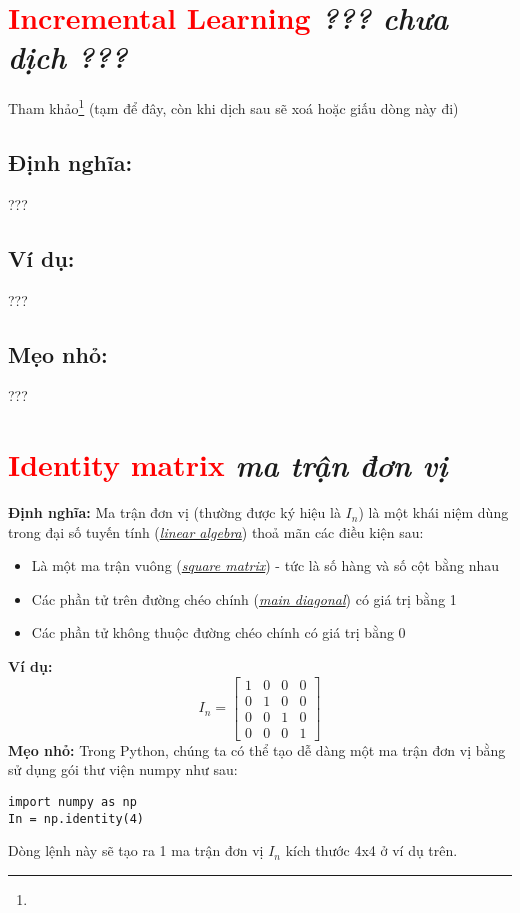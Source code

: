 \section*{\huge \textcolor{Red}{Incremental Learning}  \small \textit{??? chưa dịch ???} }
Tham khảo\footnote{} (tạm để đây, còn khi dịch sau sẽ xoá hoặc giấu dòng này đi)
\subsection*{Định nghĩa:}
???
\subsection*{Ví dụ:}
???
\subsection*{Mẹo nhỏ:}
???
\section*{\huge \textcolor{Red}{Identity matrix}  \small \textit{ma trận đơn vị} }
\large {\textbf{Định nghĩa:}}
\newline
\noindent
\newline
Ma trận đơn vị (thường được ký hiệu là \(I_n\)) là một khái niệm dùng trong đại số tuyến tính   (\underline{\textit{linear algebra}}) thoả mãn các điều kiện sau:
\begin{itemize}
\item Là một ma trận vuông (\underline{\textit{square matrix}}) - tức là số hàng và số cột bằng nhau
\item Các phần tử trên đường chéo chính (\underline{\textit{main diagonal}}) có giá trị bằng 1
\item Các phần tử không thuộc đường chéo chính có giá trị bằng 0
\end{itemize}
\noindent
\large {\textbf{Ví dụ:}}
\noindent
\large {}
\newline
\begin{equation*}
I_n = 
\begin{bmatrix}
1 & 0 & 0 &0 \\
0 & 1 & 0 &0\\
0 & 0 & 1 &0\\
0 & 0 & 0 &1
\end{bmatrix}
\end{equation*}
\large {\textbf{Mẹo nhỏ:}}
\newline
\noindent
\newline
Trong Python, chúng ta có thể tạo dễ dàng một ma trận đơn vị bằng sử dụng gói thư viện numpy như sau:
\begin{verbatim}
import numpy as np
In = np.identity(4)
\end{verbatim}
\noindent
Dòng lệnh này sẽ tạo ra 1 ma trận đơn vị   \(I_n\)   kích thước 4x4 ở ví dụ trên.

